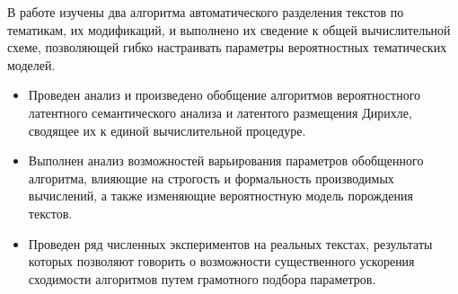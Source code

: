 В работе изучены два алгоритма автоматического разделения текстов по тематикам, их модификаций, и выполнено их сведение к общей вычислительной схеме, позволяющей гибко настраивать параметры вероятностных тематических моделей.

\begin{itemize}
	\item Проведен анализ и произведено обобщение алгоритмов вероятностного латентного семантического анализа и латентого размещения Дирихле, сводящее их к единой вычислительной процедуре.
	\item Выполнен анализ возможностей варьирования параметров обобщенного алгоритма, влияющие на строгость и формальность производимых вычислений, а также изменяющие вероятностную модель порождения текстов.
	\item Проведен ряд численных экспериментов на реальных текстах, результаты которых позволяют говорить о возможности существенного ускорения сходимости алгоритмов путем грамотного подбора параметров.
\end{itemize}